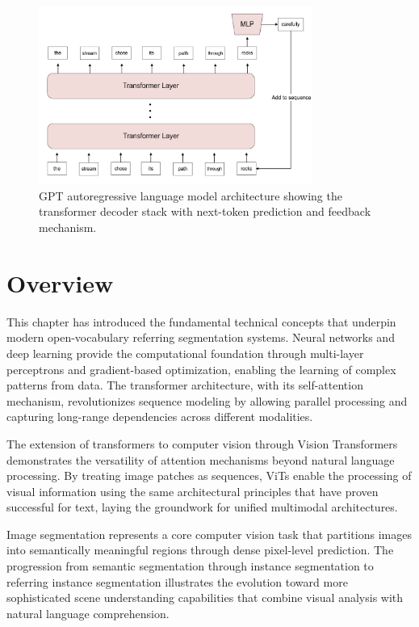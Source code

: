 \begin{figure}[htbp]
\centering
\includegraphics[width=0.8\textwidth]{Images/gpt.png}
\caption{GPT autoregressive language model architecture showing the transformer decoder stack with next-token prediction and feedback mechanism.}
\label{fig:gpt}
\end{figure}

\section{Overview}

This chapter has introduced the fundamental technical concepts that underpin modern open-vocabulary referring segmentation systems. Neural networks and deep learning provide the computational foundation through multi-layer perceptrons and gradient-based optimization, enabling the learning of complex patterns from data. The transformer architecture, with its self-attention mechanism, revolutionizes sequence modeling by allowing parallel processing and capturing long-range dependencies across different modalities.

The extension of transformers to computer vision through Vision Transformers demonstrates the versatility of attention mechanisms beyond natural language processing. By treating image patches as sequences, ViTs enable the processing of visual information using the same architectural principles that have proven successful for text, laying the groundwork for unified multimodal architectures.

Image segmentation represents a core computer vision task that partitions images into semantically meaningful regions through dense pixel-level prediction. The progression from semantic segmentation through instance segmentation to referring instance segmentation illustrates the evolution toward more sophisticated scene understanding capabilities that combine visual analysis with natural language comprehension.

